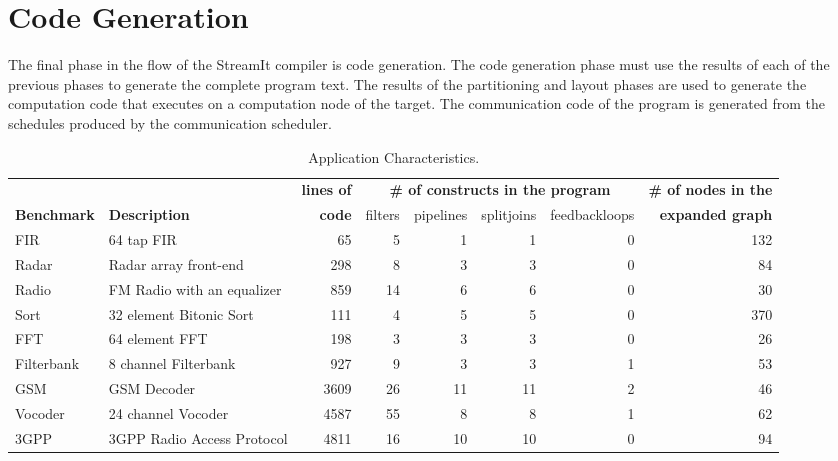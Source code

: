 \section{Code Generation}
\label{sec:codegen}

The final phase in the flow of the StreamIt compiler is code
generation.  The code generation phase must use the results of each of
the previous phases to generate the complete program text.  The
results of the partitioning and layout phases are used to generate the
computation code that executes on a computation node of the target.
The communication code of the program is generated from the schedules
produced by the communication scheduler.

\begin{table*}[t]
\begin{center}
\scriptsize
\begin{tabular}{|l|l||r||r|r|r|r||r|} \hline
 & & {\bf lines of} & \multicolumn{4}{|c||}{\bf \# of constructs in the program} & {\bf \# of nodes in the} \\ \cline{4-7}
{\bf Benchmark} & {\bf Description} & {\bf code} & filters & pipelines & splitjoins & feedbackloops & {\bf expanded graph}
\\
\hline \hline
FIR & 64 tap FIR & 
65 & 5 & 1 & 1 & 0 & 132
\\ \hline
Radar & Radar array front-end\cite{pca} & 
298 & 8 & 3 & 3 & 0 & 84
\\ \hline
Radio & FM Radio with an equalizer & 
859 & 14 & 6 & 6 & 0 & 30
\\ \hline
Sort & 32 element Bitonic Sort & 
111 & 4 & 5 & 5 & 0 & 370
\\  \hline
FFT & 64 element FFT & 
198 & 3 & 3 & 3 & 0 & 26
\\  \hline
Filterbank & 8 channel Filterbank & 
927 & 9 & 3 & 3 & 1 & 53
\\  \hline
GSM & GSM Decoder & 
3609 & 26 & 11 & 11 & 2 & 46
\\ \hline
Vocoder & 24 channel Vocoder &  
4587 & 55 & 8 & 8 & 1 & 62
\\ \hline
3GPP & 3GPP Radio Access Protocol &  
4811 & 16 & 10 & 10 & 0 & 94
\\ \hline
\hline
\end{tabular}
\vspace{-6pt}
\caption{\protect\small Application Characteristics.}
\label{tab:benchmarks}
\vspace{-12pt}
\end{center}
\end{table*}

